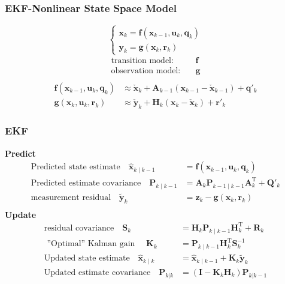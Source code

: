 \documentclass[14pt,hyperref={CJKbookmarks=true}]{beamer}
\theoremstyle{plain}
\theoremstyle{definition}
\theoremstyle{remark}
\begin{document}
\begin{frame}
\frametitle{EKF-Nonlinear State Space Model} \small
\begin{equation*}
\begin{cases}
\mathbf{x}_k=\mathbf{f}(\mathbf{x}_{k-1},\mathbf{u}_{k},\mathbf{q}_{k})\\
\mathbf{y}_k=\mathbf{g}(\mathbf{x}_k,\mathbf{r}_k)
\end{cases}
\end{equation*}
\begin{equation*}
\begin{split}
\text{transition model:}\quad& \mathbf{f}\\
\text{observation model:}\quad& \mathbf{g}\\
\end{split}
\end{equation*}
\pause
\begin{equation*}
\begin{split}
\mathbf{f}(\mathbf{x}_{k-1},\mathbf{u}_{k},\mathbf{q}_{k})&\approx\check{\mathbf{x}}_k+\mathbf{A}_{k-1}(\mathbf{x}_{k-1}-\check{\mathbf{x}}_{k-1})+\mathbf{q}'_k\\
\mathbf{g}(\mathbf{x}_{k},\mathbf{u}_{k},\mathbf{r}_{k})&\approx\check{\mathbf{y}}_k+\mathbf{H}_{k}(\mathbf{x}_{k}-\check{\mathbf{x}}_{k})+\mathbf{r}'_k
\end{split}
\end{equation*}
\end{frame}


\begin{frame}
\small
\frametitle{EKF}{}
\small
{\bf{Predict}}
\begin{equation*}
\begin{split}
\text{Predicted state estimate} \quad \hat{\mathbf{x}}_{k\mid k-1} &= \mathbf{f}(\mathbf{x}_{k-1},\mathbf{u}_{k},\mathbf{q}_{k})\\
\text{Predicted estimate covariance} \quad\mathbf{P}_{k\mid k-1} &=  \mathbf{A}_k \mathbf{P}_{k-1\mid k-1} \mathbf{A}_k^\mathrm{T} + \mathbf{Q}'_k\\
\text{measurement residual}\quad \tilde{\mathbf{y}}_k &= \mathbf{z}_k - \mathbf{g}(\mathbf{x}_k,\mathbf{r}_k)\\
\end{split}
\end{equation*}
\pause
{\bf{Update}}
\begin{equation*}
\begin{split}
\text{residual covariance}\quad\mathbf{S}_k& = \mathbf{H}_k \mathbf{P}_{k\mid k-1} \mathbf{H}_k^\mathrm{T} + \mathbf{R}_k \\
\text{ ''Optimal'' Kalman gain }\quad \mathbf{K}_k &= \mathbf{P}_{k\mid k-1}\mathbf{H}_k^\mathrm{T} \mathbf{S}_k^{-1}\\
\text{Updated state estimate}\quad \hat{\mathbf{x}}_{k\mid k} &= \hat{\mathbf{x}}_{k\mid k-1} + \mathbf{K}_k\tilde{\mathbf{y}}_k\\
\text{Updated estimate covariance}\quad\mathbf{P}_{k|k} &= (\mathbf{I} - \mathbf{K}_k \mathbf{H}_k) \mathbf{P}_{k|k-1} \\
\end{split}
\end{equation*}
\end{frame}
\end{document}
